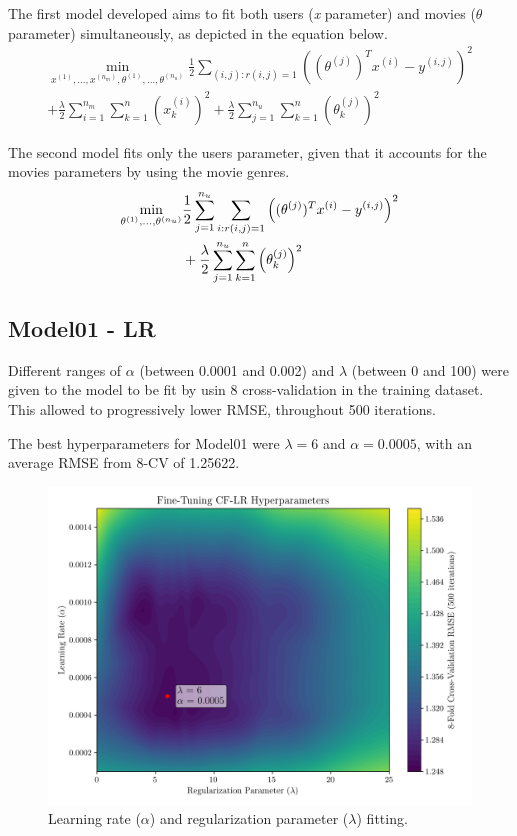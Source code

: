 \documentclass[conference]{IEEEtran}
\begin{document}
The first model developed aims to fit both users (\textit{x} parameter) and movies ($\theta$ parameter) simultaneously, as depicted in the equation below.
\begin{multline}
\min_{x^{(1)}, \dots, x^{(n_m)}, \theta^{(1)}, \dots, \theta^{(n_u)}} 
\frac{1}{2} \sum_{(i, j) : r(i, j) = 1} \left( (\theta^{(j)})^T x^{(i)} - y^{(i,j)} \right)^2 \\
+ \frac{\lambda}{2} \sum_{i=1}^{n_m} \sum_{k=1}^{n} \left( x_k^{(i)} \right)^2 + \frac{\lambda}{2} \sum_{j=1}^{n_u} \sum_{k=1}^{n} \left( \theta_k^{(j)} \right)^2
\end{multline}


The second model fits only the users parameter, given that it accounts for the movies parameters by using the movie genres.
\begin{align}
\min_{\theta^{(1)}, \dots, \theta^{(n_u)}} 
&\frac{1}{2} \sum_{j=1}^{n_u} \sum_{i : r(i, j) = 1} \left( (\theta^{(j)})^T x^{(i)} - y^{(i,j)} \right)^2 \notag \\
&+ \frac{\lambda}{2} \sum_{j=1}^{n_u} \sum_{k=1}^{n} \left( \theta_k^{(j)} \right)^2
\end{align}

\subsection{Model01 - LR}

Different ranges of $\alpha$ (between 0.0001 and 0.002) and $\lambda$ (between 0 and 100) were given to the model to be fit by usin 8 cross-validation in the training dataset. This allowed to progressively lower RMSE, throughout 500 iterations.

The best hyperparameters for Model01 were $\lambda = 6$ and $\alpha = 0.0005$, with an average RMSE from 8-CV of 1.25622.

\begin{figure}[H]
    \centering
    \includegraphics[width=1\linewidth]{assets/model01_hyperparametres.png}
    \caption{Learning rate ($\alpha$) and regularization parameter ($\lambda$) fitting.}
    \label{fig:model01_hyperparametres}
\end{figure}
\end{document}
